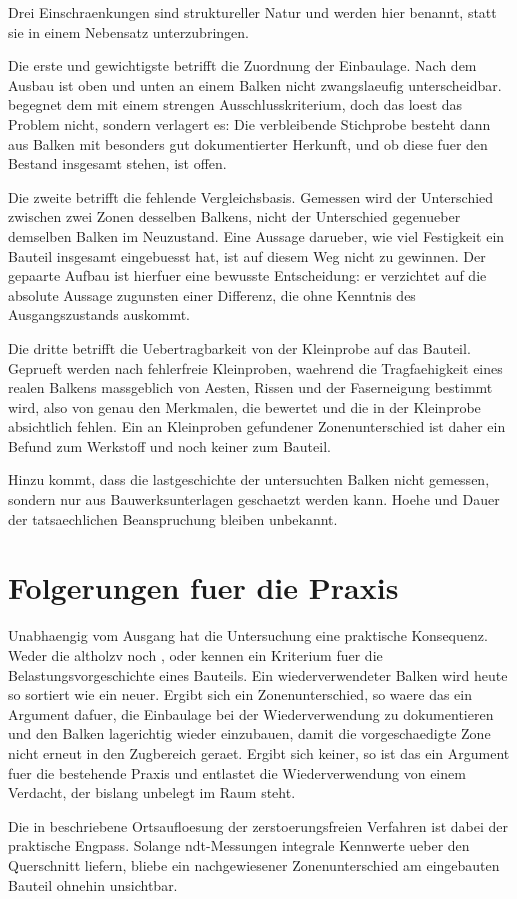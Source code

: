 Drei Einschraenkungen sind struktureller Natur und werden hier benannt, statt
sie in einem Nebensatz unterzubringen.

Die erste und gewichtigste betrifft die Zuordnung der Einbaulage. Nach dem
Ausbau ist oben und unten an einem Balken nicht zwangslaeufig unterscheidbar.
 begegnet dem mit einem strengen Ausschlusskriterium, doch
das loest das Problem nicht, sondern verlagert es: Die verbleibende Stichprobe
besteht dann aus Balken mit besonders gut dokumentierter Herkunft, und ob
diese fuer den Bestand insgesamt stehen, ist offen.

Die zweite betrifft die fehlende Vergleichsbasis. Gemessen wird der
Unterschied zwischen zwei Zonen desselben Balkens, nicht der Unterschied
gegenueber demselben Balken im Neuzustand. Eine Aussage darueber, wie viel
Festigkeit ein Bauteil insgesamt eingebuesst hat, ist auf diesem Weg nicht zu
gewinnen. Der gepaarte Aufbau ist hierfuer eine bewusste Entscheidung: er
verzichtet auf die absolute Aussage zugunsten einer Differenz, die ohne
Kenntnis des Ausgangszustands auskommt.

Die dritte betrifft die Uebertragbarkeit von der Kleinprobe auf das Bauteil.
Geprueft werden nach  fehlerfreie Kleinproben, waehrend die
Tragfaehigkeit eines realen Balkens massgeblich von Aesten, Rissen und der
Faserneigung bestimmt wird, also von genau den Merkmalen, die
\parencite{din4074} bewertet und die in der Kleinprobe absichtlich fehlen. Ein
an Kleinproben gefundener Zonenunterschied ist daher ein Befund zum Werkstoff
und noch keiner zum Bauteil.

Hinzu kommt, dass die \gls{lastgeschichte} der untersuchten Balken nicht
gemessen, sondern nur aus Bauwerksunterlagen geschaetzt werden kann. Hoehe und
Dauer der tatsaechlichen Beanspruchung bleiben unbekannt.

\section{Folgerungen fuer die Praxis}
\label{sec:implications}

Unabhaengig vom Ausgang hat die Untersuchung eine praktische Konsequenz. Weder
die \acrshort{altholzv} noch \parencite{din4074}, \parencite{en338} oder
\parencite{ec5} kennen ein Kriterium fuer die Belastungsvorgeschichte eines
Bauteils. Ein wiederverwendeter Balken wird heute so sortiert wie ein neuer.
Ergibt sich ein Zonenunterschied, so waere das ein Argument dafuer, die
Einbaulage bei der Wiederverwendung zu dokumentieren und den Balken lagerichtig
wieder einzubauen, damit die vorgeschaedigte Zone nicht erneut in den
Zugbereich geraet. Ergibt sich keiner, so ist das ein Argument fuer die
bestehende Praxis und entlastet die Wiederverwendung von einem Verdacht, der
bislang unbelegt im Raum steht.

Die in  beschriebene Ortsaufloesung der zerstoerungsfreien
Verfahren ist dabei der praktische Engpass. Solange \acrshort{ndt}-Messungen
integrale Kennwerte ueber den Querschnitt liefern, bliebe ein nachgewiesener
Zonenunterschied am eingebauten Bauteil ohnehin unsichtbar.
